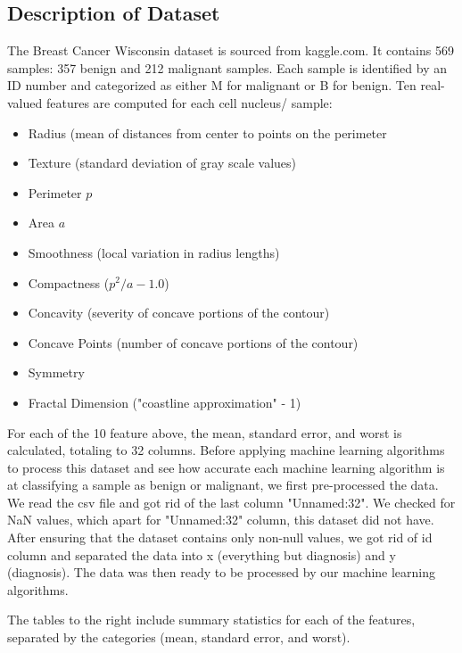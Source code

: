 \documentclass[conference]{IEEEtran}
\begin{document}
\subsection{Description of Dataset}
The Breast Cancer Wisconsin dataset is sourced from kaggle.com. It contains 569 samples: 357 benign and 212 malignant samples. Each sample is identified by an ID number and categorized as either M for malignant or B for benign. Ten real-valued features are computed for each cell nucleus/ sample: 
\begin{itemize}
	\item Radius (mean of distances from center to points on the perimeter
 	\item Texture (standard deviation of gray scale values)
  	\item Perimeter $p$
   	\item Area $a$
        \item Smoothness (local variation in radius lengths)
        \item Compactness ($p^2 / a - 1.0$)
        \item Concavity (severity of concave portions of the contour)
        \item Concave Points (number of concave portions of the contour)
	\item Symmetry
 	\item Fractal Dimension ("coastline approximation" - 1)
\end{itemize}

For each of the 10 feature above, the mean, standard error, and worst is calculated, totaling to 32 columns. Before applying machine learning algorithms to process this dataset and see how accurate each machine learning algorithm is at classifying a sample as benign or malignant, we first pre-processed the data. We read the csv file and got rid of the last column "Unnamed:32". We checked for NaN values, which apart for "Unnamed:32" column, this dataset did not have. After ensuring that the dataset contains only non-null values, we got rid of id column and separated the data into x (everything but diagnosis) and y (diagnosis). The data was then ready to be processed by our machine learning algorithms.

The tables to the right include summary statistics for each of the features, separated by the categories (mean, standard error, and worst).
\end{document}
